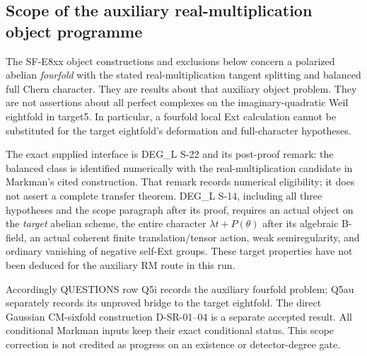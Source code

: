 \subsection*{Scope of the auxiliary real-multiplication object programme}
The SF-E8xx object constructions and exclusions below concern a polarized
abelian \emph{fourfold} with the stated real-multiplication tangent
splitting and balanced full Chern character. They are results about that
auxiliary object problem. They are not assertions about all perfect
complexes on the imaginary-quadratic Weil eightfold in target5.
In particular, a fourfold local Ext calculation cannot be substituted
for the target eightfold's deformation and full-character hypotheses.

The exact supplied interface is DEG\_L S-22 and its post-proof remark:
the balanced class is identified numerically with the real-multiplication
candidate in Markman's cited construction. That remark records numerical
eligibility; it does not assert a complete transfer theorem. DEG\_L S-14,
including all three hypotheses and the scope paragraph after its proof,
requires an actual object on the \emph{target} abelian scheme, the entire
character \(\lambda t+P(\theta)\) after its algebraic B-field, an actual
coherent finite translation/tensor action, weak semiregularity, and
ordinary vanishing of negative self-Ext groups. These target properties
have not been deduced for the auxiliary RM route in this run.

Accordingly QUESTIONS row Q5i records the auxiliary fourfold problem;
Q5au separately records its unproved bridge to the target eightfold.
The direct Gaussian CM-sixfold construction D-SR-01--04 is a separate
accepted result. All conditional Markman inputs keep their exact
conditional status. This scope correction is not credited as progress
on an existence or detector-degree gate.
